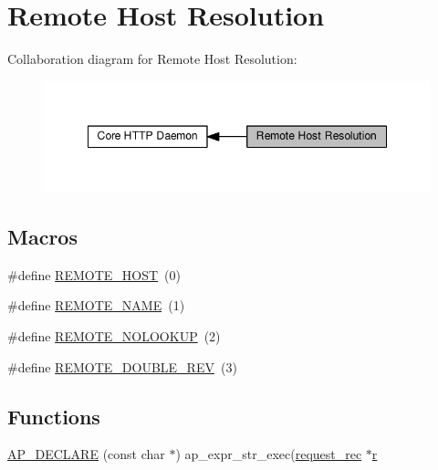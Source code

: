 \hypertarget{group__get__remote__host}{}\section{Remote Host Resolution}
\label{group__get__remote__host}
Collaboration diagram for Remote Host Resolution\+:
\nopagebreak
\begin{figure}[H]
\begin{center}
\leavevmode
\includegraphics[width=348pt]{group__get__remote__host}
\end{center}
\end{figure}
\subsection*{Macros}
\begin{DoxyCompactItemize}
\item 
\#define \hyperlink{group__get__remote__host_ga4dddc39b16889bfb467fdbeaf5e8ea2f}{R\+E\+M\+O\+T\+E\+\_\+\+H\+O\+ST}~(0)
\item 
\#define \hyperlink{group__get__remote__host_ga58fce12ea2be474cd9c108db868d3035}{R\+E\+M\+O\+T\+E\+\_\+\+N\+A\+ME}~(1)
\item 
\#define \hyperlink{group__get__remote__host_ga3d0c829d0d80f6481aaf7ad01e23f2e6}{R\+E\+M\+O\+T\+E\+\_\+\+N\+O\+L\+O\+O\+K\+UP}~(2)
\item 
\#define \hyperlink{group__get__remote__host_ga56799bd18cc1727ea5247854ea7cd523}{R\+E\+M\+O\+T\+E\+\_\+\+D\+O\+U\+B\+L\+E\+\_\+\+R\+EV}~(3)
\end{DoxyCompactItemize}
\subsection*{Functions}
\begin{DoxyCompactItemize}
\item 
\hyperlink{group__get__remote__host_gaa0b6d3ee3cfd9a8e8cb57936e467abfd}{A\+P\+\_\+\+D\+E\+C\+L\+A\+RE} (const char $\ast$) ap\+\_\+expr\+\_\+str\+\_\+exec(\hyperlink{structrequest__rec}{request\+\_\+rec} $\ast$\hyperlink{pcregrep_8txt_a2e9e9438b26c0bb4425367a7e4f75eb3}{r}
\end{DoxyCompactItemize}


